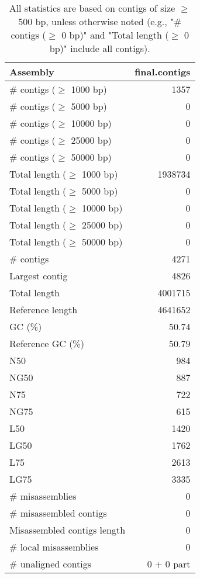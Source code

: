 \documentclass[12pt,a4paper]{article}
\begin{document}
\begin{table}[ht]
\begin{center}
\caption{All statistics are based on contigs of size $\geq$ 500 bp, unless otherwise noted (e.g., "\# contigs ($\geq$ 0 bp)" and "Total length ($\geq$ 0 bp)" include all contigs).}
\begin{tabular}{|l*{1}{|r}|}
\hline
Assembly & final.contigs \\ \hline
\# contigs ($\geq$ 1000 bp) & 1357 \\ \hline
\# contigs ($\geq$ 5000 bp) & 0 \\ \hline
\# contigs ($\geq$ 10000 bp) & 0 \\ \hline
\# contigs ($\geq$ 25000 bp) & 0 \\ \hline
\# contigs ($\geq$ 50000 bp) & 0 \\ \hline
Total length ($\geq$ 1000 bp) & 1938734 \\ \hline
Total length ($\geq$ 5000 bp) & 0 \\ \hline
Total length ($\geq$ 10000 bp) & 0 \\ \hline
Total length ($\geq$ 25000 bp) & 0 \\ \hline
Total length ($\geq$ 50000 bp) & 0 \\ \hline
\# contigs & 4271 \\ \hline
Largest contig & 4826 \\ \hline
Total length & 4001715 \\ \hline
Reference length & 4641652 \\ \hline
GC (\%) & 50.74 \\ \hline
Reference GC (\%) & 50.79 \\ \hline
N50 & 984 \\ \hline
NG50 & 887 \\ \hline
N75 & 722 \\ \hline
NG75 & 615 \\ \hline
L50 & 1420 \\ \hline
LG50 & 1762 \\ \hline
L75 & 2613 \\ \hline
LG75 & 3335 \\ \hline
\# misassemblies & 0 \\ \hline
\# misassembled contigs & 0 \\ \hline
Misassembled contigs length & 0 \\ \hline
\# local misassemblies & 0 \\ \hline
\# unaligned contigs & 0 + 0 part \\ \hline

\end{tabular}
\end{center}
\end{table}
\end{document}
